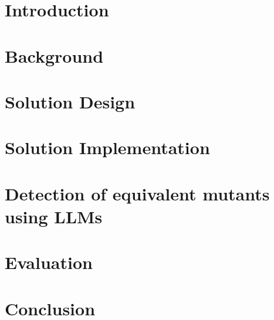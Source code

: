\chapter{Introduction}
\setcounter{page}{1}



\chapter{Background}



\chapter{Solution Design}



\chapter{Solution Implementation}



\chapter{Detection of equivalent mutants using LLMs} 



\chapter{Evaluation}



\chapter{Conclusion}

